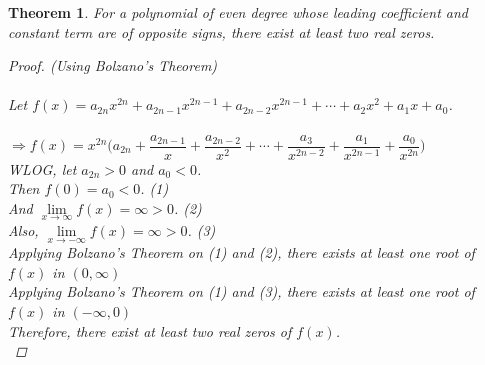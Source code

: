 \documentclass[14]{article}
\newtheorem{theorem}{Theorem}
\begin{document}
\begin{theorem}
For a polynomial of even degree whose leading coefficient and constant term are of opposite signs, there exist at least two real zeros.
\begin{proof}
(Using Bolzano's Theorem)\\\\
Let $f(x) = a_{2n} x^{2n} + a_{2n-1}x^{2n-1} + a_{2n-2}x^{2n-1} + \cdots + a_2 x^2 + a_1 x + a_0$.\\\\
$\Rightarrow f(x) = x^{2n} \Big( a_{2n} +
\dfrac{a_{2n-1}}{x} + \dfrac{a_{2n-2}}{x^2} + \cdots + \dfrac{a_{3}}{x^{2n-2}} + \dfrac{a_1}{x^{2n-1}} + \dfrac{a_0}{x^{2n}} \Big)$\\
WLOG, let $a_{2n} > 0$ and $a_0 < 0$.\\
Then $f(0) = a_{0} < 0$. (1)\\
And $\lim\limits_{x \to \infty} f(x) = \infty > 0$. (2)\\
Also, $\lim\limits_{x \to -\infty} f(x) =\infty > 0$. (3)\\
Applying Bolzano's Theorem on (1) and (2), there exists at least one root of $f(x)$ in $(0, \infty)$\\
Applying Bolzano's Theorem on (1) and (3), there exists at least one root of $f(x)$ in $(-\infty, 0)$\\
Therefore, there exist at least two real zeros of $f(x)$.\\
\end{proof}
\end{theorem}
\pagebreak
\end{document}
